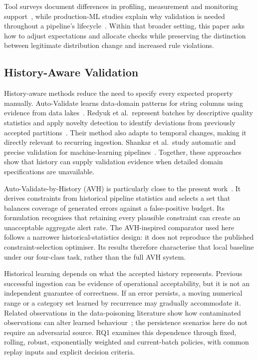 Tool surveys document differences in profiling, measurement and monitoring support~\cite{Ehrlinger2022}, while production-ML studies explain why validation is needed throughout a pipeline's lifecycle~\cite{Sculley2015,Breck2017,Polyzotis2018}. Within that broader setting, this paper asks how to adjust expectations and allocate checks while preserving the distinction between legitimate distribution change and increased rule violations.

\subsection{History-Aware Validation}

History-aware methods reduce the need to specify every expected property manually. Auto-Validate learns data-domain patterns for string columns using evidence from data lakes~\cite{SongHe2021}. Redyuk et al.\ represent batches by descriptive quality statistics and apply novelty detection to identify deviations from previously accepted partitions~\cite{Redyuk2021}. Their method also adapts to temporal changes, making it directly relevant to recurring ingestion. Shankar et al.\ study automatic and precise validation for machine-learning pipelines~\cite{Shankar2023}. Together, these approaches show that history can supply validation evidence when detailed domain specifications are unavailable.

Auto-Validate-by-History (AVH) is particularly close to the present work~\cite{Tu2023}. It derives constraints from historical pipeline statistics and selects a set that balances coverage of generated errors against a false-positive budget. Its formulation recognises that retaining every plausible constraint can create an unacceptable aggregate alert rate. The AVH-inspired comparator used here follows a narrower historical-statistics design: it does not reproduce the published constraint-selection optimiser. Its results therefore characterise that local baseline under our four-class task, rather than the full AVH system.

Historical learning depends on what the accepted history represents. Previous successful ingestion can be evidence of operational acceptability, but it is not an independent guarantee of correctness. If an error persists, a moving numerical range or a category set learned by recurrence may gradually accommodate it. Related observations in the data-poisoning literature show how contaminated observations can alter learned behaviour~\cite{Biggio2012,Steinhardt2017}; the persistence scenarios here do not require an adversarial source. RQ1 examines this dependence through fixed, rolling, robust, exponentially weighted and current-batch policies, with common replay inputs and explicit decision criteria.

